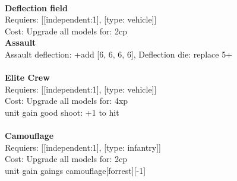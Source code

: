 \ \\
{\bf Deflection field } \\

Requiers: [[independent:1], [type: vehicle]] \\
Cost: Upgrade all models for: 2cp \\




{\bf Assault} \ \\
Assault deflection: +add [6, 6, 6, 6], Deflection die: replace 5+
\\ 




\ \\
{\bf Elite Crew } \\

Requiers: [[independent:1], [type: vehicle]] \\
Cost: Upgrade all models for: 4xp \\
unit gain good shoot: +1 to hit\\ 









\ \\
{\bf Camouflage } \\

Requiers: [[independent:1], [type: infantry]] \\
Cost: Upgrade all models for: 2cp \\
unit gain gaings camouflage[forrest][-1]\\ 









